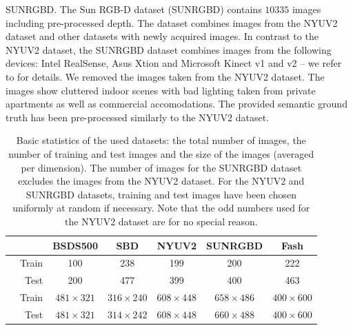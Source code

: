 \documentclass[5p]{elsarticle}
\def\BSDS{BSDS500\xspace}
\def\NYU{NYUV2\xspace}
\def\Fash{Fash\xspace}
\def\SBD{SBD\xspace}
\def\SUNRGBD{SUNRGBD\xspace}
\newcommand*\rot{\rotatebox{90}}
\begin{document}
{\SUNRGBD \cite{SongLichtenbergXiao:2015}.} The Sun RGB-D dataset (\SUNRGBD)
contains $10335$ images including pre-processed depth. The dataset combines images
from the \NYU dataset and other datasets \cite{JanochKarayevJiaBarronFritzSaenkoDarrell:2011, XiaoOwensTorralba:2013}
with newly acquired images. In contrast to the \NYU dataset, the \SUNRGBD dataset combines images
from the following devices: Intel RealSense, Asus Xtion and Microsoft Kinect v1 and v2
-- we refer to \cite{SongLichtenbergXiao:2015} for details. We removed the images
taken from the \NYU dataset. The images show cluttered indoor scenes with bad lighting taken
from private apartments as well as commercial accomodations. The provided semantic
ground truth has been pre-processed similarly to the \NYU dataset.

\begin{table}[t]
    \centering
    {\scriptsize
        \begin{tabular}{r | r | c c c c c}
            && \BSDS & \SBD & \NYU & \SUNRGBD & \Fash\\\hline
            \multirow{2}{*}{\rot{Images}} & Train & 100 & 238 & 199 & 200 & 222\\
            & Test & 200 & 477 & 399 & 400 & 463\\\hline
            \multirow{2}{*}{\rot{Size}} & Train & $481 \times 321$ & $316 \times 240$ & $608 \times 448$ & $658 \times 486$ & $400 \times 600$\\
            & Test & $481 \times 321$ & $314 \times 242$ & $608 \times 448$ & $660 \times 488$ & $400 \times 600$\\\hline
        \end{tabular}
    }
    \caption{Basic statistics of the used datasets: the total number of images,
	the number of training and test images and the size of the images (averaged per dimension).
	The number of images for the \SUNRGBD dataset excludes the images from the \NYU dataset.
	For the \NYU and \SUNRGBD datasets, training and test images have been chosen
	uniformly at random if necessary. Note that the odd numbers used for the \NYU dataset are for no
	special reason.}
    \label{table:datasets}
\end{table}
\end{document}
